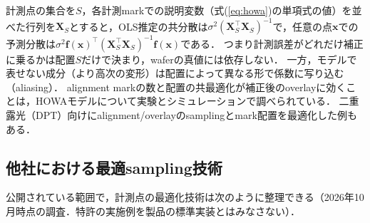 \documentclass[10.5pt,a4paper]{ltjsarticle}
\begin{document}
計測点の集合を$S$，各計測markでの説明変数（式(\ref{eq:howa})の単項式の値）を並べた行列を$\bm{X}_S$とすると，OLS推定の共分散は$\sigma^2(\bm{X}_S^\top\bm{X}_S)^{-1}$で，任意の点$\bm{x}$での予測分散は$\sigma^2\bm{f}(\bm{x})^\top(\bm{X}_S^\top\bm{X}_S)^{-1}\bm{f}(\bm{x})$である．
つまり計測誤差がどれだけ補正に乗るかは配置$S$だけで決まり，waferの真値には依存しない．
一方，モデルで表せない成分（より高次の変形）は配置によって異なる形で係数に写り込む（aliasing）．
alignment markの数と配置の共最適化が補正後のoverlayに効くことは，HOWAモデルについて実験とシミュレーションで調べられている\cite{chiu2022a}．
二重露光（DPT）向けにalignment/overlayのsamplingとmark配置を最適化した例もある\cite{chue2009}．

\subsection{他社における最適sampling技術}
\label{sec:other-companies}

公開されている範囲で，計測点の最適化技術は次のように整理できる（2026年10月時点の調査．特許の実施例を製品の標準実装とはみなさない）．
\end{document}
